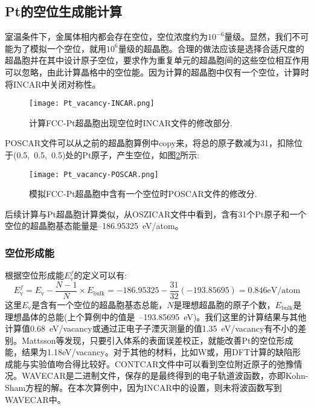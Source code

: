 \subsection{\rm{Pt}的空位生成能计算}
室温条件下，金属体相内都会存在空位，空位浓度约为$10^{-6}$量级。显然，我们不可能为了模拟一个空位，就用$10^6$量级的超晶胞。合理的做法应该是选择合适尺度的超晶胞并在其中设计原子空位，要求作为重复单元的超晶胞间的这些空位相互作用可以忽略，由此计算晶格中的空位能。因为计算的超晶胞中仅有一个空位，计算时将\textrm{INCAR}中关闭对称性。
\begin{figure}[h!]
\centering
\texttt{[image: Pt\_vacancy-INCAR.png]}
\caption{\small \textrm{计算\textrm{FCC-Pt}超晶胞出现空位时\textrm{INCAR}文件的修改部分.}}%
\label{Pt_Bulk-INCAR-modified}
\end{figure}

\textrm{POSCAR}文件可以从之前的超晶胞算例中\textrm{copy}来，将总的原子数减为31，扣除位于(0.5,~0.5,~0.5)处的\textrm{Pt}原子，产生空位，如图\ref{Pt_vacancy-POSCAR}所示:~
\begin{figure}[h!]
\centering
\vskip -3pt
\texttt{[image: Pt\_vacancy-POSCAR.png]}
\caption{\small \textrm{模拟\textrm{FCC-Pt}超晶胞中含有一个空位时\textrm{POSCAR}文件的修改分.}}%
\label{Pt_vacancy-POSCAR}
\end{figure}

后续计算与\textrm{Pt}超晶胞计算类似，从\textrm{OSZICAR}文件中看到，含有31个\textrm{Pt}原子和一个空位的超晶胞基态能量是--186.95325\textrm{~eV/atom}。
\subsubsection{空位形成能}
根据空位形成能$E_{\mathrm{v}}^f$的定义可以有:~
\begin{displaymath}
	E_{\mathrm{v}}^f=E_{\mathrm{v}}-\dfrac{N-1}N\times E_{\mathrm{bulk}}=-186.95325-\dfrac{31}{32}(-193.85695)=0.846\mathrm{eV/atom}
\end{displaymath}
这里$E_{\mathrm{v}}$是含有一个空位的超晶胞基态总能，$N$是理想超晶胞的原子个数，$E_{\mathrm{bulk}}$是理想晶体的总能(上个算例中的值是~--193.85695~\textrm{eV})。我们这里的计算结果与其他计算值0.68\textrm{~eV/vacancy}或通过正电子子湮灭测量的值1.35\textrm{~eV/vacancy}\cite{PSSA102-47_1987}有不小的差别。\textrm{Mattsson}等发现，只要引入体系的表面误差校正，就能改善\textrm{Pt}的空位形成能，结果为1.18\textrm{eV/vacancy}。\cite{PRB66-214110_2002}对于其他的材料，比如\textrm{W}\cite{JNM383-244_2009}或\cite{JMS44-1828_2009}，用\textrm{DFT}计算的缺陷形成能与实验值吻合得比较好。\textrm{CONTCAR}文件中可以看到空位附近原子的弛豫情况。\textrm{WAVECAR}是二进制文件，保存的是最终得到的电子轨道波函数，亦即\textrm{Kohn-Sham}方程的解。在本次算例中，因为\textrm{INCAR}中的设置，则未将波函数写到\textrm{WAVECAR}中。
